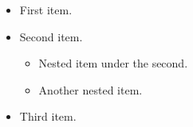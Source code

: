 \documentclass{article}
\begin{document}
\begin{itemize}
  \item First item.
  \item Second item.
  \begin{itemize}
    \item Nested item under the second.
    \item Another nested item.
  \end{itemize}
  \item Third item.
\end{itemize}
\end{document}
